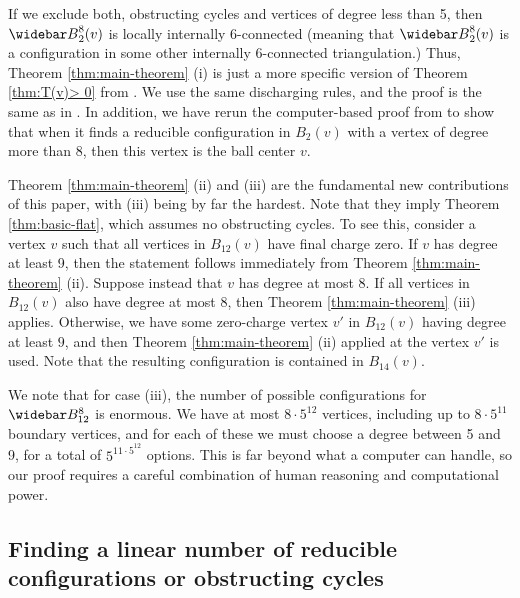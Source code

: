 \documentclass[10pt,a4paper]{article}
\renewcommand{\bar}{\widebar}
\begin{document}
If we exclude both, obstructing cycles and vertices of degree less than 5, then
${\bar B}^8_2(v)$ is locally internally 6-connected
(meaning that ${\bar B}^8_2(v)$ is a configuration in some other internally 6-connected triangulation.)
Thus, Theorem \ref{thm:main-theorem} (i) is just a more specific version of Theorem \ref{thm:T(v)> 0} from \cite{steinberger2010unavoidable}. We use the same discharging rules, and the proof is the same as in \cite{steinberger2010unavoidable}. 
In addition, we have 
rerun the computer-based proof from \cite{steinberger2010unavoidable} to show that when it finds a reducible configuration in $B_2(v)$ with a vertex of degree more than 8, then this vertex is the ball center $v$.

Theorem \ref{thm:main-theorem} (ii) and (iii) are the fundamental new contributions of this paper, with (iii) being by far the hardest. Note that they imply Theorem \ref{thm:basic-flat}, which assumes no obstructing cycles. To see this, consider a vertex $v$ such that all vertices in $B_{12}(v)$
have final charge zero. If $v$ has degree at least 9, then the statement follows immediately from Theorem \ref{thm:main-theorem} (ii). Suppose instead that $v$ has degree at most $8$. If all vertices in $B_{12}(v)$ 
also have degree at most $8$, then Theorem \ref{thm:main-theorem} (iii) applies. Otherwise, we have some zero-charge vertex $v'$ in $B_{12}(v)$ 
having degree at least $9$, and then Theorem \ref{thm:main-theorem} (ii) applied at the vertex $v'$ is used. Note that the resulting configuration is contained in $B_{14}(v)$. 


We note that for case (iii), the number of possible configurations for $\bar B^8_{12}$ is enormous.
We have at most $8\cdot 5^{12}$ vertices, including up to $8\cdot 5^{11}$ boundary vertices, and for each of these we must choose a degree between 5 and 9, for a total of $5^{11\cdot 5^{12}}$ options. This is far beyond what a computer can handle, so our proof requires a careful combination of human reasoning and computational power.



\subsection{Finding a linear number of reducible configurations or obstructing cycles}\label{sec:accounting}
\end{document}
